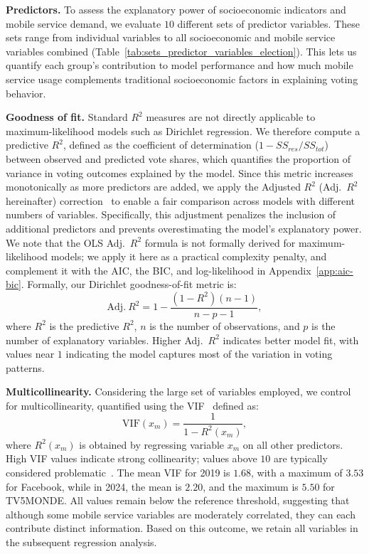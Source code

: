 \documentclass[9pt,sigconf,letterpaper]{acmart}
\newcommand{\adjrsquare}{Adj.~$R^2$\xspace}
\begin{document}
\noindent\textbf{Predictors.}
To assess the explanatory power of socioeconomic indicators and mobile service demand, we evaluate $10$ different sets of predictor variables.
These sets range from individual variables to all socioeconomic and mobile service variables combined (Table~\ref{tab:sets_predictor_variables_election}).
This lets us quantify each group's contribution to model performance and how much mobile service usage complements traditional socioeconomic factors in explaining voting behavior.

\noindent\textbf{Goodness of fit.}
Standard $R^2$ measures are not directly applicable to maximum-likelihood models such as Dirichlet regression. We therefore compute a predictive $R^2$, defined as the coefficient of determination ($1 - SS_{res}/SS_{tot}$) between observed and predicted vote shares, which quantifies the proportion of variance in voting outcomes explained by the model.
Since this metric increases monotonically as more predictors are added, we apply the Adjusted $R^2$ (\adjrsquare hereinafter) correction~\cite{james2013introduction} to enable a fair comparison across models with different numbers of variables. Specifically, this adjustment penalizes the inclusion of additional predictors and prevents overestimating the model’s explanatory power.
We note that the OLS \adjrsquare formula is not formally derived for maximum-likelihood models; we apply it here as a practical complexity penalty, and complement it with the \ac{AIC}, the \ac{BIC}, and log-likelihood in Appendix~\ref{app:aic-bic}.
Formally, our Dirichlet goodness-of-fit metric is:
\begin{equation}
\text{Adj.}~R^2 = 1 - \frac{(1-R^2)(n-1)}{n-p-1},
\label{eq:political_election_explanation_adj_r2}
\end{equation}
where $R^2$ is the predictive $R^2$, $n$ is the number of observations, and $p$ is the number of explanatory variables.
Higher \adjrsquare indicates better model fit, %
with values near $1$ indicating the model captures most of the variation in voting patterns.

\noindent\textbf{Multicollinearity.}
Considering the large set of variables employed, we control for multicollinearity, quantified using the \ac{VIF}~\cite{james2013introduction} defined as:
\begin{equation}
\text{VIF}(x_m) = \frac{1}{1 - {R^2}(x_m)},
\end{equation}
where ${R^2}(x_m)$ is obtained by regressing variable $x_m$ on all other predictors.
High \ac{VIF} values indicate strong collinearity; values above $10$ are typically considered problematic~\cite{weisberg2005applied}.
The mean \ac{VIF} for 2019 is $1.68$, with a maximum of $3.53$ for Facebook, while in 2024, the mean is $2.20$, and the maximum is $5.50$ for TV5MONDE.
All values remain below the reference threshold, suggesting that although some mobile service variables are moderately correlated, they can each contribute distinct information.
Based on this outcome, we retain all variables in the subsequent regression analysis.
\end{document}

